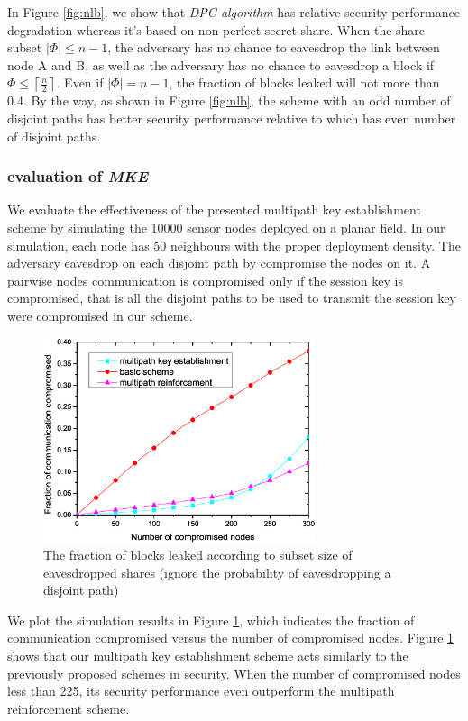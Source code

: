 \documentclass[nocopyrightspace,9pt]{sigplanconf}
\newcommand\lanceil[2]{\left\lceil\frac{#1}{#2}\right\rceil}
\begin{document}
In Figure \ref{fig:nlb}, we show that \textit{DPC algorithm} has relative security performance degradation
whereas it's based on non-perfect secret share. When the share subset $|\Phi|\leq n-1$, the adversary
has no chance to eavesdrop the link between node A and B, as well as
the adversary has no chance to eavesdrop a block if $\Phi \leq \lanceil{n}{2}$.
Even if $|\Phi| =n-1$, the fraction of
blocks leaked will not more than 0.4. By the way, as shown in Figure \ref{fig:nlb}, the scheme with
an odd number of disjoint paths has better security performance relative to which has even number
of disjoint paths.

\subsubsection*{evaluation of \textit{MKE}}
We evaluate the effectiveness of the presented multipath key establishment scheme
by simulating the 10000 sensor nodes deployed on a planar field.
In our simulation, each node has 50 neighbours with the proper deployment density.
The adversary eavesdrop on each disjoint path by compromise the nodes on it.
A pairwise nodes communication is compromised only if the session key is compromised,
that is all the disjoint paths to be used to transmit the session key were compromised in
our scheme.\\

\begin{figure}[htbp]
\centering
\includegraphics[width=80mm]{compromise.eps}
\caption{The fraction of blocks leaked according to subset size
of eavesdropped shares (ignore the probability of eavesdropping a disjoint path)}
\label{fig:compromise}
\end{figure}


We plot the simulation results in Figure \ref{fig:compromise}, which indicates
the fraction of communication compromised versus the number of compromised nodes.
Figure \ref{fig:compromise} shows
that our multipath key establishment scheme acts similarly to the previously proposed schemes in security.
When the number of compromised nodes less than 225, its security performance even outperform
the multipath reinforcement scheme.\\
\end{document}
